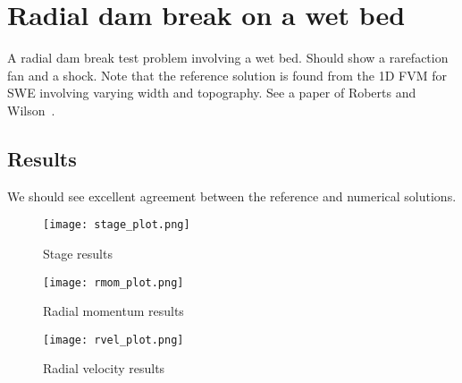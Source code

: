 
\section{Radial dam break on a wet bed}

A radial dam break test problem involving a wet bed. Should show a rarefaction fan and a shock. Note that the reference solution is found from the 1D FVM for SWE involving varying width and topography. See a paper of Roberts and Wilson~\cite{RW2011}.


\subsection{Results}

We should see excellent agreement between the reference and numerical solutions.

\begin{figure}
\begin{center}
\texttt{[image: stage\_plot.png]}
\end{center}
\caption{Stage results}
\end{figure}


\begin{figure}
\begin{center}
\texttt{[image: rmom\_plot.png]}
\end{center}
\caption{Radial momentum results}
\end{figure}


\begin{figure}
\begin{center}
\texttt{[image: rvel\_plot.png]}
\end{center}
\caption{Radial velocity results}
\end{figure}


\endinput
